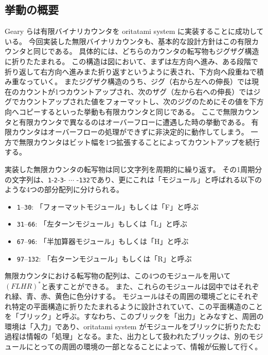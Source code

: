 \documentclass[a4,11pt]{article}
\begin{document}

\subsection{挙動の概要}
Geary らは有限バイナリカウンタを oritatami system に実装することに成功している\cite{GeMeScSe2019}。
今回実装した無限バイナリカウンタも、基本的な設計方針はこの有限カウンタと同じである。
具体的には、どちらのカウンタの転写物もジグザグ構造に折りたたまれる。
この構造は図において、まずは左方向へ進み、ある段階で折り返して右方向へ進みまた折り返すというように表され、下方向へ段重ねで積み重なっていく。
またジグザク構造のうち、ジグ（右から左への伸長）では現在のカウントが1つカウントアップされ、次のザグ（左から右への伸長）ではジグでカウントアップされた値をフォーマットし、次のジグのためにその値を下方向へコピーするといった挙動も有限カウンタと同じである。
ここで無限カウンタと有限カウンタで異なるのはオーバーフローに遭遇した時の挙動である。
有限カウンタはオーバーフローの処理ができずに非決定的に動作してしまう。
一方で無限カウンタはビット幅を1つ拡張することによってカウントアップを続行する。
%
%


実装した無限カウンタの転写物は同じ文字列を周期的に繰り返す。
その1周期分の文字列は、\texttt{1}-\texttt{2}-\texttt{3}- $\cdots$ -\texttt{132}であり、更にこれは「モジュール」と呼ばれる以下のような4つの部分配列に分けられる。

\begin{itemize}
\item \texttt{1}--\texttt{30}: 「フォーマットモジュール」もしくは「F」と呼ぶ
\item \texttt{31}--\texttt{66}: 「左ターンモジュール」もしくは「L」と呼ぶ
\item \texttt{67}--\texttt{96}: 「半加算器モジュール」もしくは「H」と呼ぶ
\item \texttt{97}--\texttt{132}: 「右ターンモジュール」もしくは「R」と呼ぶ
\end{itemize}

無限カウンタにおける転写物の配列は、この4つのモジュールを用いて$(FLHR)^*$と表すことができる。
また、これらのモジュールは図中ではそれぞれ緑、青、赤、黄色に色分けする。
モジュールはその周囲の環境ごとにそれぞれ特定の平面構造に折りたたまれるように設計されていて、この平面構造のことを「ブリック」と呼ぶ。すなわち、このブリックを「出力」とみなすと、周囲の環境は「入力」であり、oritatami system がモジュールをブリックに折りたたむ過程は情報の「処理」となる。また、出力として扱われたブリックは、別のモジュールにとっての周囲の環境の一部となることによって、情報が伝搬して行く。
\end{document}
